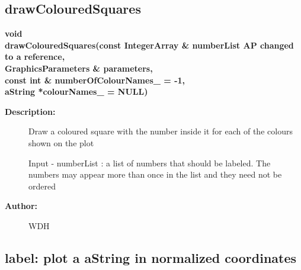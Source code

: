 \subsection{drawColouredSquares}
 
\begin{flushleft} \textbf{%
void  \\ 
\settowidth{\GLGraphicsInterfaceIncludeArgIndent}{drawColouredSquares(}%
drawColouredSquares(const IntegerArray \& numberList AP changed to a reference,\\ 
\hspace{\GLGraphicsInterfaceIncludeArgIndent}GraphicsParameters \& parameters,\\ 
\hspace{\GLGraphicsInterfaceIncludeArgIndent}const int \& numberOfColourNames\_  = -1,\\ 
\hspace{\GLGraphicsInterfaceIncludeArgIndent}aString *colourNames\_  = NULL)
}\end{flushleft}
\begin{description}
\item[{\bf Description:}] 
 Draw a coloured square with the number inside it for each of the colours
 shown on the plot 

 Input -
   numberList : a list of numbers that should be labeled. The numbers
                may appear more than once in the list and they need not
                be ordered
\item[{\bf Author:}]  WDH
\end{description}
\subsection{label: plot a aString in normalized coordinates}
 
